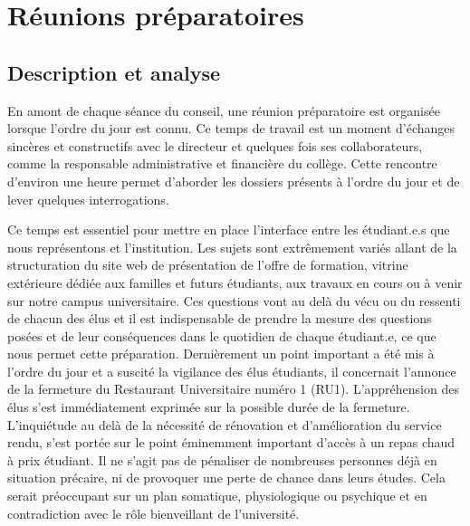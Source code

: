 \documentclass{article}
\begin{document}
\newpage

\section{Réunions préparatoires} 

\subsection{Description et analyse}
En amont de chaque séance du conseil, une réunion préparatoire est organisée lorsque l'ordre du jour est connu. Ce temps de travail est un moment d'échanges sincères et constructifs avec le directeur et quelques fois ses collaborateurs, comme la responsable administrative et financière du collège. Cette rencontre d'environ une heure permet d'aborder les dossiers présents à l'ordre du jour et de lever quelques interrogations.

Ce temps est essentiel pour mettre en place l'interface entre les étudiant.e.s que nous représentons et l'institution. Les sujets sont extrêmement variés allant de la structuration du site web de présentation de l'offre de formation, vitrine extérieure dédiée aux familles et futurs étudiants, aux travaux en cours ou à venir sur notre campus universitaire. Ces questions vont au delà du vécu ou du ressenti de chacun des élus et il est indispensable de prendre la mesure des questions posées et de leur conséquences dans le quotidien de chaque étudiant.e, ce que nous permet cette préparation. Dernièrement un point important a été mis à l'ordre du jour et a suscité la vigilance des élus étudiants, il concernait l'annonce de la fermeture du Restaurant Universitaire numéro 1 (RU1). L'appréhension des élus s'est immédiatement exprimée sur  la possible durée de la fermeture. L'inquiétude au delà de la nécessité de rénovation et d'amélioration du service rendu, s'est portée sur le point éminemment important d'accès à un repas chaud à prix étudiant. Il ne s'agit pas de pénaliser de nombreuses personnes déjà en situation précaire, ni de provoquer une perte de chance dans leurs études. Cela serait préoccupant sur un plan somatique, physiologique ou psychique et en contradiction avec le rôle bienveillant de l'université.
\end{document}

